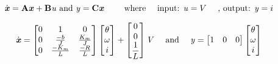 	
	\begin{equation}
	\dot{\text{\textit{\textbf{x}}}}  = {\text{\textbf{A}}}\text{\textit{\textbf{x}}}  +  {\text{\textbf{B}}}\text{\textit{{u}}}  \text{ and } \text{\textit{{y}}}  = {\text{\textbf{C}}}\text{\textit{\textbf{x}}}  \qquad \text{ where } \quad \text{input: \textit{{u}}}=V \quad\text{ , output: \textit{{y}}}=i
	\label{eq:2}
	\end{equation}
	
	
	\begin{equation}
	\dot{\text{\textit{\textbf{x}}}}  = \begin{bmatrix}
	0 & 1 & 0 \\
	0&\frac{-b}{J}&\frac{K_m}{J} \\
	0&\frac{-K_m}{L}&\frac{-R}{L} \\
	\end{bmatrix}
	\begin{bmatrix}
	\theta\\
	\omega\\
	i\\
	\end{bmatrix}
	+
	\begin{bmatrix}
	0\\
	0\\
	\dfrac{1}{L}\\
	
	\end{bmatrix}\text{\textit{{V}}}
	\quad \text{ and } \quad
	\text{\textit{{y}}}=\begin{bmatrix}
	1&0&0
	\end{bmatrix}
	\begin{bmatrix}
	\theta\\
	\omega\\
	i\\
	\end{bmatrix}
	\label{eq:3}
	\end{equation}
